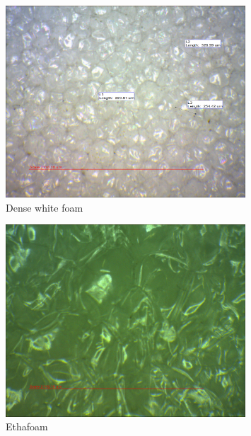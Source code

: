 \documentclass{article}
\begin{document}
\begin{figure}[H]
\centering
\includegraphics[width=0.8\textwidth]{17_white_foam.png}
\caption{\label{fig:white_foam} Dense white foam}
\end{figure}

\begin{figure}[H]
\centering
\includegraphics[width=0.8\textwidth]{17_ethafoam.png}
\caption{\label{fig:ethafoam} Ethafoam}
\end{figure}
\end{document}

